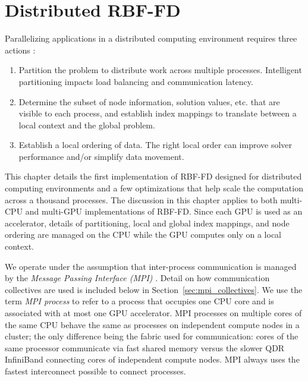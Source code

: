 \documentclass{report}
\begin{document}
\fi


\chapter{Distributed RBF-FD}
\label{chap:distributed_rbffd}

Parallelizing applications in a distributed computing environment requires three actions \cite{Saad2003}: 
\begin{enumerate} 
\item Partition the problem to distribute work across multiple processes. Intelligent partitioning
impacts load balancing and communication latency.
\item Determine the subset of node information,
solution values, etc. that are visible to each process, and establish index mappings to translate between a local context and the global problem. 
\item Establish a local ordering of data. The right local order can improve solver performance and/or simplify data movement. 
\end{enumerate}

This chapter details the first implementation of RBF-FD designed for distributed computing environments and a few optimizations that help scale the computation across a thousand processes. The discussion in this chapter applies to both multi-CPU and multi-GPU implementations of RBF-FD. Since each GPU is used as an accelerator, details of partitioning, local and global index mappings, and node ordering are managed on the CPU while the GPU computes only on a local context.  

We operate under the assumption that inter-process communication is managed by the \emph{Message Passing Interface (MPI)} \cite{MPI}. Detail on how communication collectives are used is included below in Section~\ref{sec:mpi_collectives}. We use the term \emph{MPI process} to refer to a process that occupies one CPU core and is associated with at most one GPU accelerator. MPI processes on multiple cores of the same CPU behave the same as processes on independent compute nodes in a cluster; the only difference being the fabric used for communication: cores of the same processor communicate via fast shared memory versus the slower QDR InfiniBand connecting cores of independent compute nodes. MPI always uses the fastest interconnect possible to connect processes. 
\end{document}

